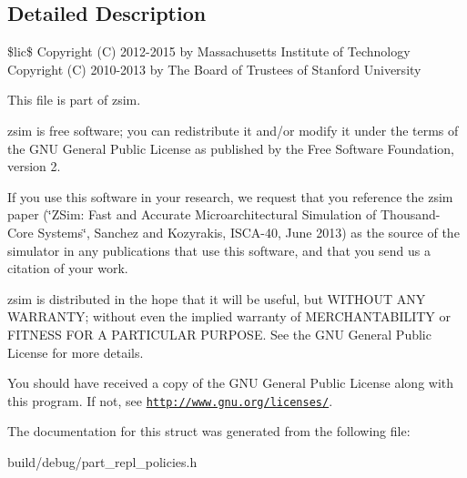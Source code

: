 \subsection{Detailed Description}
\$lic\$ Copyright (C) 2012-\/2015 by Massachusetts Institute of Technology Copyright (C) 2010-\/2013 by The Board of Trustees of Stanford University

This file is part of zsim.

zsim is free software; you can redistribute it and/or modify it under the terms of the G\-N\-U General Public License as published by the Free Software Foundation, version 2.

If you use this software in your research, we request that you reference the zsim paper (\char`\"{}\-Z\-Sim\-: Fast and Accurate Microarchitectural Simulation of
\-Thousand-\/\-Core Systems\char`\"{}, Sanchez and Kozyrakis, I\-S\-C\-A-\/40, June 2013) as the source of the simulator in any publications that use this software, and that you send us a citation of your work.

zsim is distributed in the hope that it will be useful, but W\-I\-T\-H\-O\-U\-T A\-N\-Y W\-A\-R\-R\-A\-N\-T\-Y; without even the implied warranty of M\-E\-R\-C\-H\-A\-N\-T\-A\-B\-I\-L\-I\-T\-Y or F\-I\-T\-N\-E\-S\-S F\-O\-R A P\-A\-R\-T\-I\-C\-U\-L\-A\-R P\-U\-R\-P\-O\-S\-E. See the G\-N\-U General Public License for more details.

You should have received a copy of the G\-N\-U General Public License along with this program. If not, see \href{http://www.gnu.org/licenses/}{\tt http\-://www.\-gnu.\-org/licenses/}. 

The documentation for this struct was generated from the following file\-:\begin{DoxyCompactItemize}
\item 
build/debug/part\-\_\-repl\-\_\-policies.\-h\end{DoxyCompactItemize}
